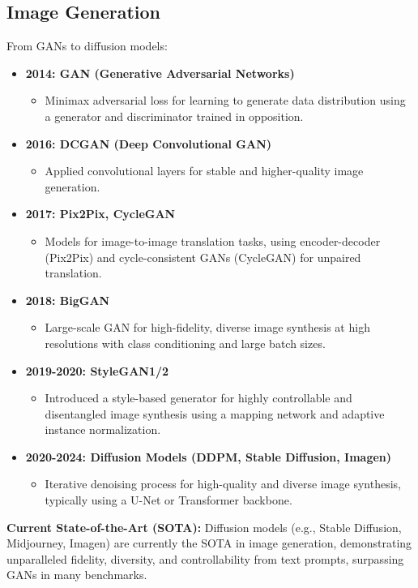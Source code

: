 \documentclass{article}
\begin{document}
\subsection{Image Generation}
From GANs to diffusion models:
\begin{itemize}[leftmargin=1.5em]
  \item \textbf{2014: GAN (Generative Adversarial Networks)}
    \begin{itemize}
      \item Minimax adversarial loss for learning to generate data distribution using a generator and discriminator trained in opposition.
    \end{itemize}
  \item \textbf{2016: DCGAN (Deep Convolutional GAN)}
    \begin{itemize}
      \item Applied convolutional layers for stable and higher-quality image generation.
    \end{itemize}
  \item \textbf{2017: Pix2Pix, CycleGAN}
    \begin{itemize}
      \item Models for image-to-image translation tasks, using encoder-decoder (Pix2Pix) and cycle-consistent GANs (CycleGAN) for unpaired translation.
    \end{itemize}
  \item \textbf{2018: BigGAN}
    \begin{itemize}
      \item Large-scale GAN for high-fidelity, diverse image synthesis at high resolutions with class conditioning and large batch sizes.
    \end{itemize}
  \item \textbf{2019-2020: StyleGAN1/2}
    \begin{itemize}
      \item Introduced a style-based generator for highly controllable and disentangled image synthesis using a mapping network and adaptive instance normalization.
    \end{itemize}
  \item \textbf{2020-2024: Diffusion Models (DDPM, Stable Diffusion, Imagen)}
    \begin{itemize}
      \item Iterative denoising process for high-quality and diverse image synthesis, typically using a U-Net or Transformer backbone.
    \end{itemize}
\end{itemize}
\textbf{Current State-of-the-Art (SOTA):} Diffusion models (e.g., Stable Diffusion, Midjourney, Imagen) are currently the SOTA in image generation, demonstrating unparalleled fidelity, diversity, and controllability from text prompts, surpassing GANs in many benchmarks.
\end{document}
